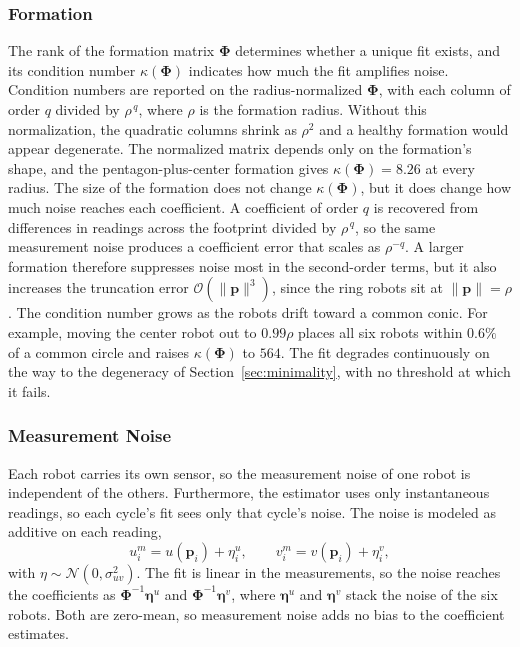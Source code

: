 \documentclass[lettersize,journal]{IEEEtran}
\begin{document}
\subsubsection{Formation}
The rank of the formation matrix $\boldsymbol{\Phi}$ determines whether
a unique fit exists, and its condition number $\kappa(\boldsymbol{\Phi})$
indicates how much the fit amplifies noise. Condition numbers are
reported on the radius-normalized $\boldsymbol{\Phi}$, with each column
of order $q$ divided by $\rho^{\,q}$, where $\rho$ is the formation radius. Without this normalization, the
quadratic columns shrink as $\rho^{2}$ and a healthy formation would
appear degenerate. The normalized matrix depends only on the formation's
shape, and the pentagon-plus-center formation gives
$\kappa(\boldsymbol{\Phi}) = 8.26$ at every radius. The size of the formation does not change
$\kappa(\boldsymbol{\Phi})$, but it does change how much noise reaches
each coefficient. A coefficient of order $q$ is recovered from
differences in readings across the footprint divided by $\rho^{\,q}$, so
the same measurement noise produces a coefficient error that scales as
$\rho^{-q}$. A larger formation therefore suppresses noise most in the
second-order terms, but it also increases the truncation error
$\mathcal{O}(\|\mathbf{p}\|^3)$, since the ring robots sit at
$\|\mathbf{p}\| = \rho$. The condition number grows as the robots
drift toward a common conic. For example, moving the center robot out
to $0.99\rho$ places all six robots within $0.6\%$ of a common circle
and raises $\kappa(\boldsymbol{\Phi})$ to $564$. The fit degrades
continuously on the way to the degeneracy of
Section~\ref{sec:minimality}, with no threshold at which it fails.

\subsubsection{Measurement Noise}
Each robot carries its own sensor, so the measurement noise of one robot
is independent of the others. Furthermore, the estimator uses only
instantaneous readings, so each cycle's fit sees only that cycle's
noise. The noise is modeled as additive on each reading,
\begin{equation}
    u_i^m = u(\mathbf{p}_i) + \eta_i^u, \qquad
    v_i^m = v(\mathbf{p}_i) + \eta_i^v,
    \label{eq:meas_noise}
\end{equation}
with $\eta \sim \mathcal{N}(0, \sigma_{uv}^2)$. The fit is linear in the
measurements, so the noise reaches the coefficients as
$\boldsymbol{\Phi}^{-1}\boldsymbol{\eta}^u$ and
$\boldsymbol{\Phi}^{-1}\boldsymbol{\eta}^v$, where $\boldsymbol{\eta}^u$
and $\boldsymbol{\eta}^v$ stack the noise of the six robots. Both are
zero-mean, so measurement noise adds no bias to the coefficient estimates.
\end{document}
